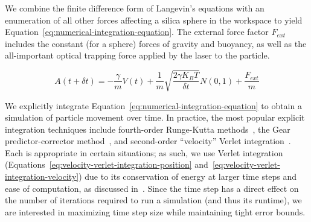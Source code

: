 
We combine the finite difference form of Langevin's equations with an
enumeration of all other forces affecting a silica sphere in the workspace to
yield Equation~\ref{eq:numerical-integration-equation}.  The external force
factor $F_{ext}$ includes the constant (for a sphere) forces of gravity and
buoyancy, as well as the all-important optical trapping force 
applied by the laser to the particle.


\begin{equation}
\label{eq:numerical-integration-equation}
 A(t + \delta t)  = -\frac{\gamma}{m}V(t) + \frac{1}{m}
\sqrt{\frac{2 \gamma K_B T}{\delta t}} N(0,1) + \frac{F_{ext}}{m} 
\end{equation}


We explicitly integrate Equation~\ref{eq:numerical-integration-equation}
to obtain a simulation of particle movement over time.  In practice, the most
popular explicit integration techniques include fourth-order Runge-Kutta
methods~\cite{jameson1981numerical}, the Gear predictor-corrector
method~\cite{allen1990computer}, and second-order ``velocity'' Verlet
integration~\cite{verlet1968computer}.  Each is appropriate in certain
situations; as such, we use Verlet integration
(Equations~\ref{eq:velocity-verlet-integration-position}
and~\ref{eq:velocity-verlet-integration-velocity}) due to its conservation of
energy at larger time steps and ease of computation, as discussed
in~\cite{balijepalli2010stochastic}.  Since the time step has a direct effect on
the number of iterations required to run a simulation (and thus its runtime), we
are interested in maximizing time step size while maintaining tight error
bounds.

